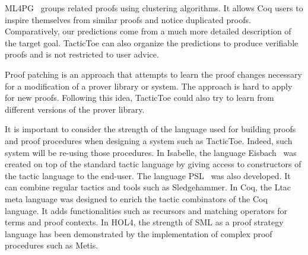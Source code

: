\documentclass[runningheads,a4paper,draft]{svjour3}
\def\holfour{\textsf{HOL4}\xspace}
\def\isabelle{\textsf{Isabelle}\xspace}
\def\coq{\textsf{Coq}\xspace}
\def\sml{\textsf{SML}\xspace}
\def\holyhammer{\textsf{HOL(y)Hammer}\xspace}
\def\sledgehammer{\textsf{Sledgehammer}\xspace}
\def\ltac{\textsf{Ltac}\xspace}
\def\metis{\textsf{Metis}\xspace}
\def\tactictoe{\textsf{TacticToe}\xspace}
\begin{document}
\textsf{ML4PG}~\cite{DBLP:journals/corr/abs-1212-3618,DBLP:journals/mics/HerasK14}
groups related proofs using clustering
algorithms. It allows \coq users to inspire themselves from similar proofs and
notice duplicated proofs. Comparatively, our predictions come from a much more
detailed description of the target goal. \tactictoe can also organize the
predictions to produce verifiable proofs and is not restricted to user
advice.


%
Proof patching \cite{RingerYLG18} is an approach that attempts to learn the
proof changes necessary for a modification of a prover library or system. The
approach is hard to apply for new proofs. Following this idea, \tactictoe
could also try to learn from different versions of the prover library.


It is important to consider the strength of the language used for building 
proofs and proof procedures when designing a system such as \tactictoe. Indeed, 
such system will be re-using those procedures.
In \isabelle, the language {\textsf{Eisbach}\xspace}~\cite{eisbach} was created 
on top of the standard tactic language by giving access to constructors of the 
tactic language to the end-user. The language 
{\textsf{PSL}\xspace}~\cite{NagashimaK17psl} was also developed. It can combine 
regular tactics and tools such as \sledgehammer.
In \coq, the \ltac~\cite{ltac} meta language was designed to enrich the 
tactic combinators of the \coq language. It adds functionalities such as 
recursors and matching operators for terms and proof contexts.
In \holfour, the strength of \sml as a proof strategy 
language has been demonstrated by the implementation of complex proof 
procedures such as \metis. 
\end{document}
